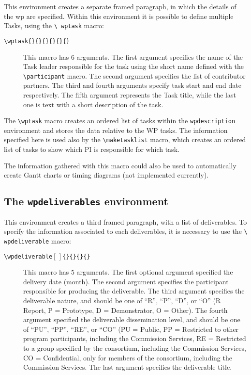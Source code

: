 \documentclass[pdftext]{article}
\begin{document}
This environment creates a separate framed paragraph, in which the
details of the wp are specified. Within this environment it is
possible to define multiple Tasks, using the \texttt{\textbackslash
  wptask} macro:
\begin{description}
\item[\texttt{\textbackslash wptask\{\}\{\}\{\}\{\}\{\}\{\}}] This
  macro has 6 arguments. The first argument specifies
  the name of the Task leader responsible for the task using the short name defined with the
  \texttt{\textbackslash participant} macro. The
  second argument specifies the list of contributor partners. The third and fourth
  arguments specify task start and end date respectively. The fifth
  argument represents the Task title, while the last one is text with
  a short description of the task.
\end{description}
The \texttt{\textbackslash wptask} macro creates an ordered list of
tasks within the \texttt{wpdescription} environment and stores the
data relative to the WP tasks. The information specified here is used
also by the \texttt{\textbackslash maketasklist} macro, which creates an
ordered list of tasks to show which PI is responsible for which task.

The information gathered with this macro could also be used to
automatically create Gantt charts or timing diagrams (not implemented
currently).

\subsection{The \texttt{wpdeliverables} environment}
\label{sec:deliv-envir}

This environment creates a third framed paragraph, with a list of
deliverables. To specify the information associated to each
deliverables, it is necessary to use the  \texttt{\textbackslash
  wpdeliverable} macro:
\begin{description}
\item[\texttt{\textbackslash wpdeliverable$[\,]$\{\}\{\}\{\}\{\}}] This
  macro has 5 arguments. The first optional argument specified the
  delivery date (month). The second argument specifies the participant responsible for producing the deliverable. The third argument specifies the deliverable
  nature, and should be one of ``R'', ``P'', ``D'', or ``O'' (R =
  Report, P = Prototype, D = Demonstrator, O = Other). The fourth
  argument specified the deliverable dissemination level, and should
  be one of ``PU'', ``PP'', ``RE'', or ``CO'' (PU = Public, PP =
  Restricted to other program participants, including the Commission
  Services, RE = Restricted to a group specified by the consortium,
  including the Commission Services, CO = Confidential, only for
  members of the consortium, including the Commission Services.
  The last argument specifies the deliverable title.
\end{description}
\end{document}
